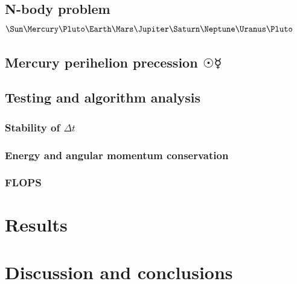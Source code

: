\documentclass[10pt]{article}
\begin{document}
\begin{multicols}{2}
\subsection{N-body problem \texorpdfstring{$\Sun\Mercury\Pluto\Earth\Mars\Jupiter\Saturn\Neptune\Uranus\Pluto$}{}} 

\subsection{Mercury perihelion precession \texorpdfstring{$\Sun\Mercury$}{}} 
\subsection{Testing and algorithm analysis}
\subsubsection{Stability of \texorpdfstring{$\Delta t$}{}}
\subsubsection{Energy and angular momentum conservation}
\subsubsection{FLOPS}

\section{Results}

\section{Discussion and conclusions}

\end{multicols}
\end{document}
